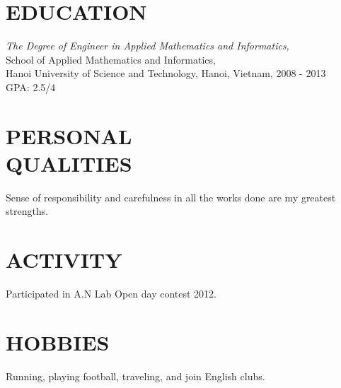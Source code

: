 \documentclass[margin, 10pt]{res}
\begin{document}
\begin{resume}
\section{EDUCATION}
   {\sl The Degree of Engineer in Applied Mathematics and Informatics,}\\
   School of Applied Mathematics and Informatics, \\
   Hanoi University of Science and Technology, Hanoi, Vietnam, 2008 - 2013 \\
   GPA: 2.5/4\\
	
\section{PERSONAL \\ QUALITIES} Sense of responsibility and carefulness in all the works done are my greatest strengths.\\
 
\section{ACTIVITY} Participated in A.N Lab Open day contest 2012.

\section{HOBBIES} Running, playing football, traveling, and join English clubs.

\end{resume}
\end{document}

